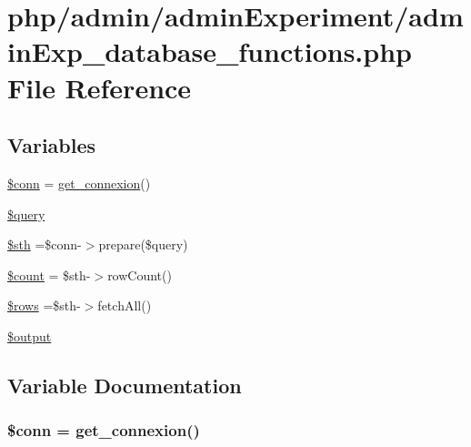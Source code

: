 \hypertarget{admin_exp__database__functions_8php}{\section{php/admin/admin\-Experiment/admin\-Exp\-\_\-database\-\_\-functions.php File Reference}
\label{admin_exp__database__functions_8php}
}
\subsection*{Variables}
\begin{DoxyCompactItemize}
\item 
\hyperlink{admin_exp__database__functions_8php_aa8a5a87b9c1a6a0819b88447cbe41877}{\$conn} = \hyperlink{php__functions_8php_ace18bc10f3fd08f92688ac743e0d8c2e}{get\-\_\-connexion}()
\item 
\hyperlink{admin_exp__database__functions_8php_af59a5f7cd609e592c41dc3643efd3c98}{\$query}
\item 
\hyperlink{admin_exp__database__functions_8php_afa9126f9664959c02795be300a135f93}{\$sth} =\$conn-\/$>$prepare(\$query)
\item 
\hyperlink{admin_exp__database__functions_8php_af789423037bbc89dc7c850e761177570}{\$count} = \$sth-\/$>$row\-Count()
\item 
\hyperlink{admin_exp__database__functions_8php_ace2ec39e7df3899fa8df9640ec274b03}{\$rows} =\$sth-\/$>$fetch\-All()
\item 
\hyperlink{admin_exp__database__functions_8php_a73004ce9cd673c1bfafd1dc351134797}{\$output}
\end{DoxyCompactItemize}


\subsection{Variable Documentation}
\hypertarget{admin_exp__database__functions_8php_aa8a5a87b9c1a6a0819b88447cbe41877}{
\subsubsection[{\$conn}]{\setlength{\rightskip}{0pt plus 5cm}\$conn = {\bf get\-\_\-connexion}()}}\label{admin_exp__database__functions_8php_aa8a5a87b9c1a6a0819b88447cbe41877}


